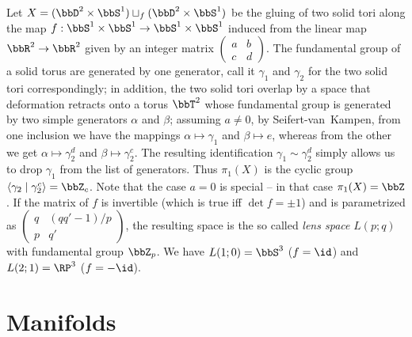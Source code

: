 \begin{example}\label{example Lens space bredon}
    Let $X=(\bbD^2\times \bbS^1)\sqcup_f (\bbD^2\times \bbS^1)$ be the gluing of two solid tori along the map $f:\bbS^1\times \bbS^1\to \bbS^1\times \bbS^1$ induced from the linear map $\bbR^2\to\bbR^2$ given by an integer matrix $\begin{pmatrix}a&b\\c&d\end{pmatrix}$. The fundamental group of a solid torus are generated by one generator, call it $\gamma_1$ and $\gamma_2$ for the two solid tori correspondingly; in addition, the two solid tori overlap by a space that deformation retracts onto a torus $\bbT^2$ whose fundamental group is generated by two simple generators $\alpha$ and $\beta$; assuming $a\neq 0$, by Seifert-van~Kampen, from one inclusion we have the mappings $\alpha\mapsto\gamma_1$ and $\beta\mapsto e$, whereas from the other we get $\alpha\mapsto \gamma_2^d$ and $\beta\mapsto \gamma_2^c$. The resulting identification $\gamma_1\sim \gamma_2^d$ simply allows us to drop $\gamma_1$ from the list of generators. Thus $\pi_1(X)$ is the cyclic group $\langle \gamma_2\mid \gamma_2^c\rangle=\bbZ_c$. Note that the case $a=0$ is special -- in that case $\pi_1(X)=\bbZ$. If the matrix of $f$ is invertible (which is true iff $\det f=\pm1$) and is parametrized as $\begin{pmatrix}q&(qq'-1)/p\\p&q'\end{pmatrix}$, the resulting space is the so called \emph{lens space} $L(p;q)$ with fundamental group $\bbZ_p$. We have $L(1;0)=\bbS^3$ ($f=\id$) and $L(2;1)=\RP^3$ ($f=-\id$).
\end{example}





\newpage

\section{Manifolds}

